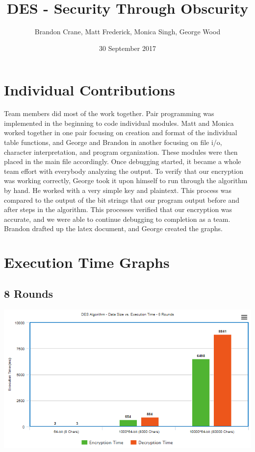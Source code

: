 \documentclass[11pt]{article}
\title{DES - Security Through Obscurity}
\author{Brandon Crane, Matt Frederick, Monica Singh, 
George Wood}
\date{30 September 2017}
\begin{document}
\maketitle

\thispagestyle{empty}

\section{Individual Contributions}
Team members did most of the work together. Pair programming was implemented
in the beginning to code individual modules. Matt and Monica worked together in
one pair focusing on creation and format of the individual table functions, and George and Brandon in another
focusing on file i/o, character interpretation, and program organization. These modules were then placed in
the main file accordingly. Once debugging started, it became
a whole team effort with everybody analyzing the output. To verify that our
encryption was working correctly,
George took it upon himself to run through the algorithm by hand. He worked with
a very simple key and plaintext. This process was compared to the output of the
bit strings that our program output before and after steps in the algorithm.
This processes verified that our encryption was accurate, and we were able to
continue debugging to completion as a team. Brandon drafted up the latex
document, and George created the graphs.


\section{Execution Time Graphs}

\setcounter{secnumdepth}{0}
\subsection{8 Rounds}
\includegraphics[scale=.8]{8RoundGraph}
\end{document}
